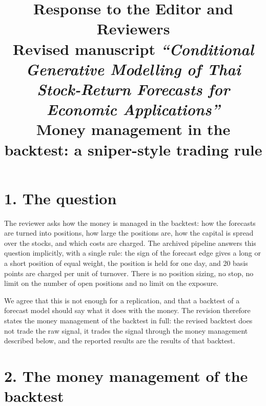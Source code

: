 \documentclass[11pt,a4paper]{article}
\title{\vspace{-2.2cm}\textbf{Response to the Editor and Reviewers}\\[0.35em]
  \large Revised manuscript \emph{``Conditional Generative Modelling of Thai Stock-Return Forecasts for Economic Applications''}\\[0.6em]
  \normalsize Money management in the backtest: a sniper-style trading rule}
\author{}
\date{}
\begin{document}
\maketitle

\section*{1. The question}

The reviewer asks how the money is managed in the backtest: how the forecasts
are turned into positions, how large the positions are, how the capital is
spread over the stocks, and which costs are charged. The archived pipeline
answers this question implicitly, with a single rule: the sign of the forecast
edge gives a long or a short position of equal weight, the position is held
for one day, and 20 basis points are charged per unit of turnover. There is no
position sizing, no stop, no limit on the number of open positions and no
limit on the exposure.

We agree that this is not enough for a replication, and that a backtest of a
forecast model should say what it does with the money. The revision therefore
states the money management of the backtest in full: the revised backtest does
not trade the raw signal, it trades the signal through the money management
described below, and the reported results are the results of that backtest.

\section*{2. The money management of the backtest}
\end{document}
